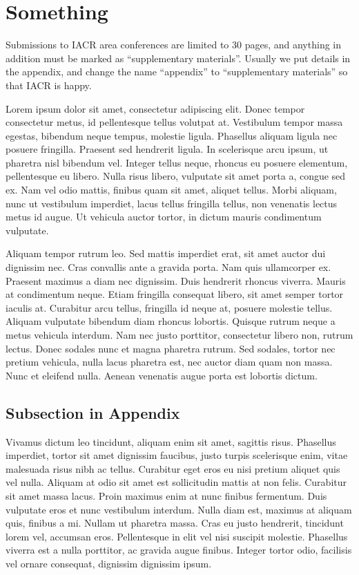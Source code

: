 \section{Something}

Submissions to IACR area conferences are limited to 30 pages, and
anything in addition must be marked as ``supplementary materials''.
Usually we put details in the appendix, and
change the name ``appendix'' to ``supplementary materials''
so that IACR is happy.

Lorem ipsum dolor sit amet, consectetur adipiscing elit. Donec tempor consectetur metus, id pellentesque tellus volutpat at. Vestibulum tempor massa egestas, bibendum neque tempus, molestie ligula. Phasellus aliquam ligula nec posuere fringilla. Praesent sed hendrerit ligula. In scelerisque arcu ipsum, ut pharetra nisl bibendum vel. Integer tellus neque, rhoncus eu posuere elementum, pellentesque eu libero. Nulla risus libero, vulputate sit amet porta a, congue sed ex. Nam vel odio mattis, finibus quam sit amet, aliquet tellus. Morbi aliquam, nunc ut vestibulum imperdiet, lacus tellus fringilla tellus, non venenatis lectus metus id augue. Ut vehicula auctor tortor, in dictum mauris condimentum vulputate.

Aliquam tempor rutrum leo. Sed mattis imperdiet erat, sit amet auctor dui dignissim nec. Cras convallis ante a gravida porta. Nam quis ullamcorper ex. Praesent maximus a diam nec dignissim. Duis hendrerit rhoncus viverra. Mauris at condimentum neque. Etiam fringilla consequat libero, sit amet semper tortor iaculis at. Curabitur arcu tellus, fringilla id neque at, posuere molestie tellus. Aliquam vulputate bibendum diam rhoncus lobortis. Quisque rutrum neque a metus vehicula interdum. Nam nec justo porttitor, consectetur libero non, rutrum lectus. Donec sodales nunc et magna pharetra rutrum. Sed sodales, tortor nec pretium vehicula, nulla lacus pharetra est, nec auctor diam quam non massa. Nunc et eleifend nulla. Aenean venenatis augue porta est lobortis dictum.

\subsection{Subsection in Appendix}

Vivamus dictum leo tincidunt, aliquam enim sit amet, sagittis risus. Phasellus imperdiet, tortor sit amet dignissim faucibus, justo turpis scelerisque enim, vitae malesuada risus nibh ac tellus. Curabitur eget eros eu nisi pretium aliquet quis vel nulla. Aliquam at odio sit amet est sollicitudin mattis at non felis. Curabitur sit amet massa lacus. Proin maximus enim at nunc finibus fermentum. Duis vulputate eros et nunc vestibulum interdum. Nulla diam est, maximus at aliquam quis, finibus a mi. Nullam ut pharetra massa. Cras eu justo hendrerit, tincidunt lorem vel, accumsan eros. Pellentesque in elit vel nisi suscipit molestie. Phasellus viverra est a nulla porttitor, ac gravida augue finibus. Integer tortor odio, facilisis vel ornare consequat, dignissim dignissim ipsum.

